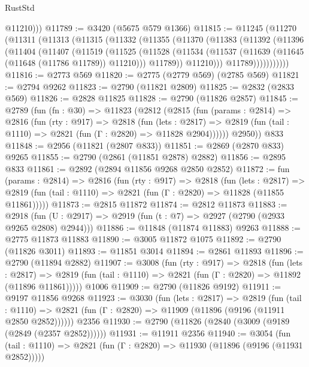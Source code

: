 \begin{lexlean}{RustStd}
\begin{coremodule}
          @11210)))
@11789 := @3420 (@5675 @579 @1366)
@11815 := @11245
    (@11270
      (@11311
        (@11313
          (@11315
            (@11332
              (@11355
                (@11370
                  (@11383
                    (@11392
                      (@11396
                        (@11404
                          (@11407
                            (@11519
                              (@11525
                                (@11528
                                  (@11534
                                    (@11537 (@11639 (@11645 (@11648 (@11786 @11789)) @11210)))
                                    @11789))
                                @11210)))
                          @11789)))))))))))
@11816 := @2773 @569
@11820 := @2775 (@2779 @569) (@2785 @569)
@11821 := @2794 @9262
@11823 := @2790 (@11821 @2809)
@11825 := @2832 (@2833 @569)
@11826 := @2828 @11825
@11828 := @2790 (@11826 @2857)
@11845 := @2789
    (fun (fn : @30) =>
    @11823
      (@2812
        (@2815
          (fun (params : @2814) =>
          @2816
            (fun (rty : @917) =>
            @2818
              (fun (lets : @2817) =>
              @2819 (fun (tail : @1110) => @2821 (fun (Γ : @2820) => @11828 @2904))))))
        @2950))
    @833
@11848 := @2956 (@11821 (@2807 @833))
@11851 := @2869 (@2870 @833) @9265
@11855 := @2790 (@2861 (@11851 @2878) @2882)
@11856 := @2895 @833
@11861 := @2892 (@2894 @11856 @9268 @2850 @2852)
@11872 := fun (params : @2814) =>
  @2816
    (fun (rty : @917) =>
    @2818
      (fun (lets : @2817) =>
      @2819 (fun (tail : @1110) => @2821 (fun (Γ : @2820) => @11828 (@11855 @11861)))))
@11873 := @2815 @11872
@11874 := @2812 @11873
@11883 := @2918 (fun (U : @2917) => @2919 (fun (t : @7) => @2927 (@2790 (@2933 @9265 @2808) @2944)))
@11886 := @11848 (@11874 @11883) @9263
@11888 := @2775 @11873 @11883
@11890 := @3005 @11872 @1075
@11892 := @2790 (@11826 @3011)
@11893 := @11851 @3014
@11894 := @2861 @11893
@11896 := @2790 (@11894 @2882)
@11907 := @3008
    (fun (rty : @917) =>
    @2818
      (fun (lets : @2817) =>
      @2819 (fun (tail : @1110) => @2821 (fun (Γ : @2820) => @11892 (@11896 @11861)))))
    @1006
@11909 := @2790 (@11826 @9192)
@11911 := @9197 @11856 @9268
@11923 := @3030
    (fun (lets : @2817) =>
    @2819
      (fun (tail : @1110) =>
      @2821 (fun (Γ : @2820) => @11909 (@11896 (@9196 (@11911 @2850 @2852))))))
    @2356
@11930 := @2790 (@11826 (@2840 (@3009 (@9189 (@2849 (@2357 @2852))))))
@11931 := @11911 @2356
@11940 := @3054
    (fun (tail : @1110) => @2821 (fun (Γ : @2820) => @11930 (@11896 (@9196 (@11931 @2852)))))

\end{coremodule}
\end{lexlean}

